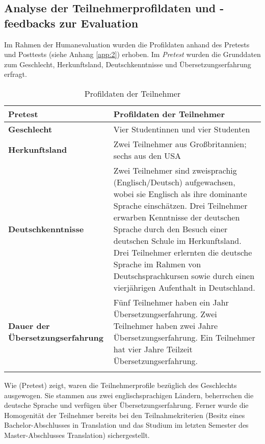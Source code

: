 \subsection{Analyse der Teilnehmerprofildaten und -feedbacks zur Evaluation}
\label{sec:5.1.4}
Im Rahmen der Humanevaluation wurden die Profildaten anhand des Pretests und Posttests (siehe Anhang \ref{app:2}) erhoben. Im \textit{Pretest} wurden die Grunddaten zum Geschlecht, Herkunftsland, Deutschkenntnisse und Übersetzungserfahrung erfragt.


\begin{table}
\begin{tabularx}{\textwidth}{p{}Q}
\lsptoprule
\textbf{Pretest} & \textbf{Profildaten der Teilnehmer}\\
\midrule
\textbf{Geschlecht}  & Vier Studentinnen und vier Studenten\\
\tablevspace
\textbf{Herkunftsland} & Zwei Teilnehmer aus Großbritannien; sechs aus den USA\\
\tablevspace
  \textbf{Deutschkenntnisse} & Zwei Teilnehmer sind zweisprachig (Englisch/Deutsch) aufgewachsen, wobei sie Englisch als ihre dominante Sprache einschätzen.\newline
    Drei Teilnehmer erwarben Kenntnisse der deutschen Sprache durch den Besuch einer deutschen Schule im Herkunftsland.\newline
    Drei Teilnehmer erlernten die deutsche Sprache im Rahmen von Deutschsprachkursen sowie durch einen vierjährigen Aufenthalt in Deutschland.\\
    \tablevspace
\textbf{Dauer der Übersetzungserfahrung} & Fünf Teilnehmer haben ein Jahr Übersetzungserfahrung.\newline
                                            Zwei Teilnehmer haben zwei Jahre Übersetzungserfahrung.\newline
                                            Ein Teilnehmer hat vier Jahre Teilzeit Übersetzungserfahrung.\\
\lspbottomrule
\end{tabularx}
\caption{\label{tab:05:15} Profildaten der Teilnehmer}
\end{table}

Wie  (Pretest) zeigt, waren die Teilnehmerprofile bezüglich des Geschlechts ausgewogen. Sie stammen aus zwei englischsprachigen Ländern, beherrschen die deutsche Sprache und verfügen über Übersetzungserfahrung. Ferner wurde die Homogenität der Teilnehmer bereits bei den Teilnahmekriterien (Besitz eines Bachelor-Abschlusses in Translation und das Studium im letzten Semester des Master-Abschlusses Translation) sichergestellt.

